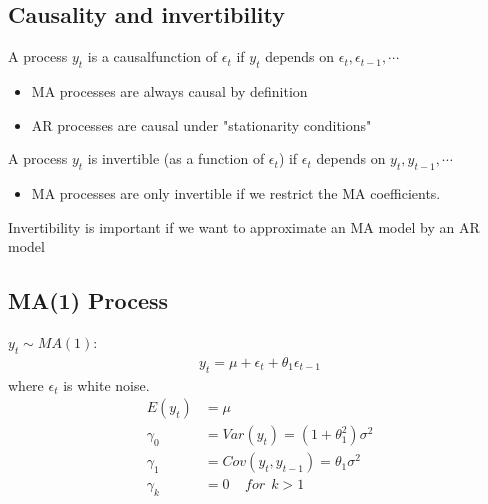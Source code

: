 \documentclass[a4paper,twoside,11pt]{article}
\begin{document}
\subsection{Causality and invertibility}
A process $y_t$ is a causalfunction of $\epsilon_t$ if $y_t$ depends on $\epsilon_t, \epsilon_{t-1},\cdots$
\begin{itemize}
    \item MA processes are always causal by definition
    \item AR processes are causal under "stationarity conditions" 
\end{itemize}
A process $y_t$ is invertible (as a function of $\epsilon_t$) if $\epsilon_t$ depends on $y_t,y_{t-1},\cdots$
\begin{itemize}
    \item MA processes are only invertible if we restrict the MA coefficients.
\end{itemize}
Invertibility is important if we want to approximate an MA model by an AR model
\begin{shaded*}
\subsection{MA(1) Process}
\noindent $y_t \sim MA(1):$
\begin{equation*}
\begin{aligned}
y_t = \mu + \epsilon_t + \theta_1 \epsilon_{t-1}
\end{aligned}
\end{equation*}
where $\epsilon_t$ is white noise.
\begin{equation*}
\begin{aligned}
E(y_t)&= \mu \\
\gamma_0 &= Var(y_t) = (1+\theta_1^2)\sigma^2 \\
\gamma_1 &= Cov(y_t,y_{t-1}) = \theta_1 \sigma^2 \\
\gamma_k &= 0 \ \ \ \ \ for \ \ k>1
\end{aligned}
\end{equation*}
\end{shaded*}
\end{document}
